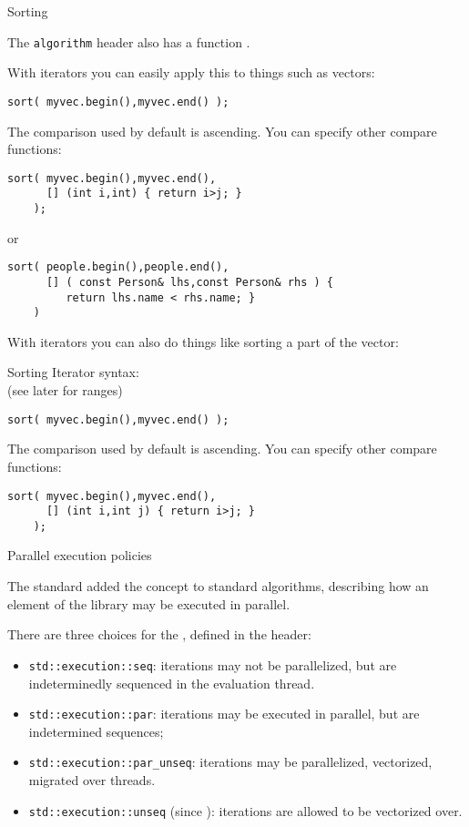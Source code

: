  {Sorting}
\label{sec:stl:sort}

The \lstinline{algorithm} header also has a function .

With iterators you can easily apply this to things such as vectors:
\begin{lstlisting}
sort( myvec.begin(),myvec.end() );
\end{lstlisting}
The comparison used by default is ascending.
You can specify other compare functions:
\begin{lstlisting}
sort( myvec.begin(),myvec.end(),
      [] (int i,int) { return i>j; }
    );
\end{lstlisting}
or
\begin{lstlisting}
sort( people.begin(),people.end(),
      [] ( const Person& lhs,const Person& rhs ) {
         return lhs.name < rhs.name; }
    )
\end{lstlisting}
With iterators you can also do things like sorting a part of the vector:

\begin{slide}{Sorting}
  \label{sl:sort-it}
  Iterator syntax:\\
  (see later for ranges)
\begin{lstlisting}
sort( myvec.begin(),myvec.end() );
\end{lstlisting}
The comparison used by default is ascending.
You can specify other compare functions:
\begin{lstlisting}
sort( myvec.begin(),myvec.end(),
      [] (int i,int j) { return i>j; }
    );
\end{lstlisting}
\end{slide}

 {Parallel execution policies}

The  standard added the 
concept to standard algorithms,
describing how an element of the  library
may be executed in parallel.

There are three choices for the ,
defined in the  header:
\begin{itemize}
\item \lstinline{std::execution::seq}: iterations may not be parallelized,
  but are indeterminedly sequenced in the evaluation thread.
\item \lstinline{std::execution::par}: iterations may be executed in parallel,
  but are indetermined sequences; 
\item \lstinline{std::execution::par_unseq}: iterations may be parallelized,
  vectorized, migrated over threads.
\item \lstinline{std::execution::unseq} (since ):
  iterations are allowed to be vectorized over.
\end{itemize}

